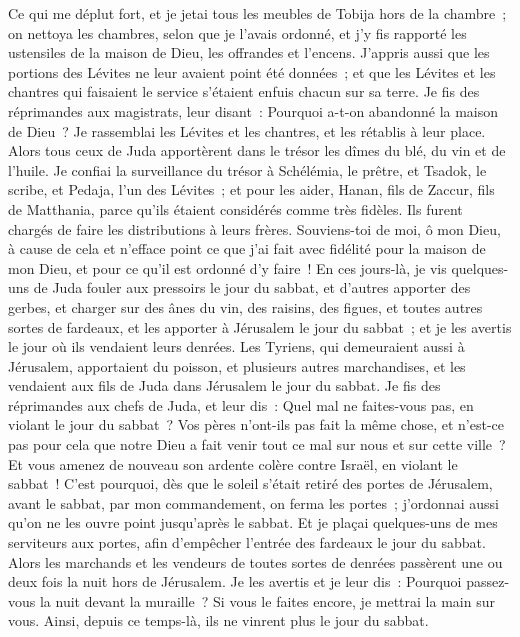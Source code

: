 \begin{multicols}{2}
Ce qui me déplut fort, et je jetai tous les meubles de Tobija hors de la chambre~;
on nettoya les chambres, selon que je l'avais ordonné, et j'y fis rapporté les ustensiles de la maison de Dieu, les offrandes et l'encens.
J'appris aussi que les portions des Lévites ne leur avaient point été données~; et que les Lévites et les chantres qui faisaient le service s'étaient enfuis chacun sur sa terre.
Je fis des réprimandes aux magistrats, leur disant~: Pourquoi a-t-on abandonné la maison de Dieu~? Je rassemblai les Lévites et les chantres, et les rétablis à leur place.
Alors tous ceux de Juda apportèrent dans le trésor les dîmes du blé, du vin et de l'huile.
Je confiai la surveillance du trésor à Schélémia, le prêtre, et Tsadok, le scribe, et Pedaja, l'un des Lévites~; et pour les aider, Hanan, fils de Zaccur, fils de Matthania, parce qu'ils étaient considérés comme très fidèles. Ils furent chargés de faire les distributions à leurs frères.
Souviens-toi de moi, ô mon Dieu, à cause de cela et n'efface point ce que j'ai fait avec fidélité pour la maison de mon Dieu, et pour ce qu'il est ordonné d'y faire~!
En ces jours-là, je vis quelques-uns de Juda fouler aux pressoirs le jour du sabbat, et d'autres apporter des gerbes, et charger sur des ânes du vin, des raisins, des figues, et toutes autres sortes de fardeaux, et les apporter à Jérusalem le jour du sabbat~; et je les avertis le jour où ils vendaient leurs denrées.
Les Tyriens, qui demeuraient aussi à Jérusalem, apportaient du poisson, et plusieurs autres marchandises, et les vendaient aux fils de Juda dans Jérusalem le jour du sabbat.
Je fis des réprimandes aux chefs de Juda, et leur dis~: Quel mal ne faites-vous pas, en violant le jour du sabbat~?
Vos pères n'ont-ils pas fait la même chose, et n'est-ce pas pour cela que notre Dieu a fait venir tout ce mal sur nous et sur cette ville~? Et vous amenez de nouveau son ardente colère contre Israël, en violant le sabbat~!
C'est pourquoi, dès que le soleil s'était retiré des portes de Jérusalem, avant le sabbat, par mon commandement, on ferma les portes~; j'ordonnai aussi qu'on ne les ouvre point jusqu'après le sabbat. Et je plaçai quelques-uns de mes serviteurs aux portes, afin d'empêcher l'entrée des fardeaux le jour du sabbat.
Alors les marchands et les vendeurs de toutes sortes de denrées passèrent une ou deux fois la nuit hors de Jérusalem.
Je les avertis et je leur dis~: Pourquoi passez-vous la nuit devant la muraille~? Si vous le faites encore, je mettrai la main sur vous. Ainsi, depuis ce temps-là, ils ne vinrent plus le jour du sabbat.

\end{multicols}
